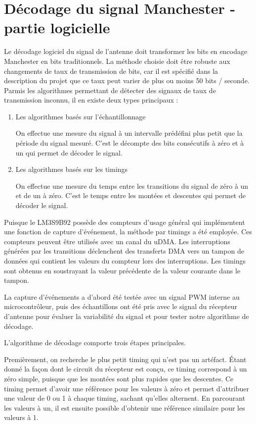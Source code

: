 \section{Décodage du signal Manchester - partie logicielle}

Le décodage logiciel du signal de l'antenne doit transformer les bits en encodage Manchester en bits traditionnels. La méthode choisie doit être robuste aux changements de taux de transmission de bits, car il est spécifié dans la description du projet que ce taux peut varier de plus ou moins 50 bits / seconde. Parmis les algorithmes permettant de détecter des signaux de taux de transmission inconnu, il en existe deux types principaux : 

\begin{enumerate}
\item{Les algorithmes basés sur l'échantillonnage}

On effectue une mesure du signal à un intervalle prédéfini plus petit que la période du signal mesuré. C'est le décompte des bits consécutifs à zéro et à un qui permet de décoder le signal.

\item{Les algorithmes basés sur les timings} 

On effectue une mesure du temps entre les transitions du signal de zéro à un et de un à zéro. C'est le temps entre les montées et descentes qui permet de décoder le signal.
\end{enumerate}

Puisque le LM3S9B92 possède des compteurs d'usage général qui implémentent une fonction de capture d'événement, la méthode par timings a été employée. Ces compteurs peuvent être utilisés avec un canal du uDMA. Les interruptions générées par les transitions déclenchent des transferts DMA vers un tampon de données qui contient les valeurs du compteur lors des interruptions. Les timings sont obtenus en soustrayant la valeur précédente de la valeur courante dans le tampon. 

La capture d'événements a d'abord été testée avec un signal PWM interne au microcontrôleur, puis des échantillons ont été pris avec le signal du récepteur d'antenne pour évaluer la variabilité du signal et pour tester notre algorithme de décodage. 

L'algorithme de décodage comporte trois étapes principales. 

Premièrement, on recherche le plus petit timing qui n'est pas un artéfact. Étant donné la façon dont le circuit du récepteur est conçu, ce timing correspond à un zéro simple, puisque que les montées sont plus rapides que les descentes. Ce timing permet d'avoir une référence pour les valeurs à zéro et permet d'attribuer une valeur de 0 ou 1 à chaque timing, sachant qu'elles alternent. En parcourant les valeurs à un, il est ensuite possible d'obtenir une référence similaire pour les valeurs à 1.


